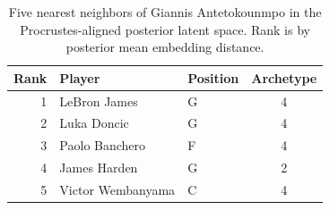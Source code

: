 \begin{table}[htbp]
  \centering\small
  \begin{tabular}{rllc}
    \toprule
    Rank & Player & Position & Archetype \\
    \midrule
    1 & LeBron James & G & 4 \\
    2 & Luka Doncic & G & 4 \\
    3 & Paolo Banchero & F & 4 \\
    4 & James Harden & G & 2 \\
    5 & Victor Wembanyama & C & 4 \\
    \bottomrule
  \end{tabular}
  \caption{Five nearest neighbors of Giannis Antetokounmpo in the Procrustes-aligned posterior latent space. Rank is by posterior mean embedding distance.}
  \label{tab:Giannis_Antetokounmpo_neighbors}
\end{table}

